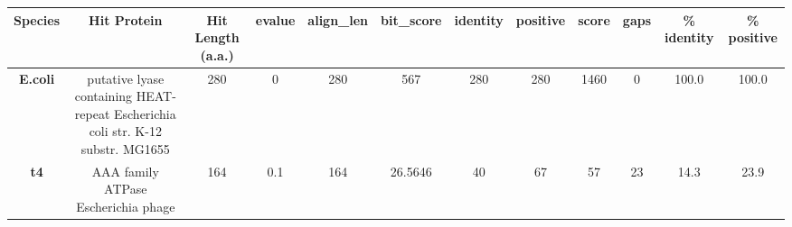 \begin{tabular}{|c|c|c|c|c|c|c|c|c|c|c|c|} \hline
\textbf{Species} & \textbf{Hit Protein} & \textbf{Hit Length (a.a.)} & \textbf{evalue} & \textbf{align\_len} & \textbf{bit\_score} & \textbf{identity} & \textbf{positive} & \textbf{score} & \textbf{gaps} & \textbf{\% identity} & \textbf{\% positive} \\ \hline
\textbf{E.coli} & putative lyase containing HEAT-repeat Escherichia coli str. K-12 substr. MG1655 & 280 & 0 & 280 & 567 & 280 & 280 & 1460 & 0 & 100.0 & 100.0\\
\textbf{t4} & AAA family ATPase Escherichia phage  & 164 & 0.1 & 164 & 26.5646 & 40 & 67 & 57 & 23 & 14.3 & 23.9\\
\hline \end{tabular}
